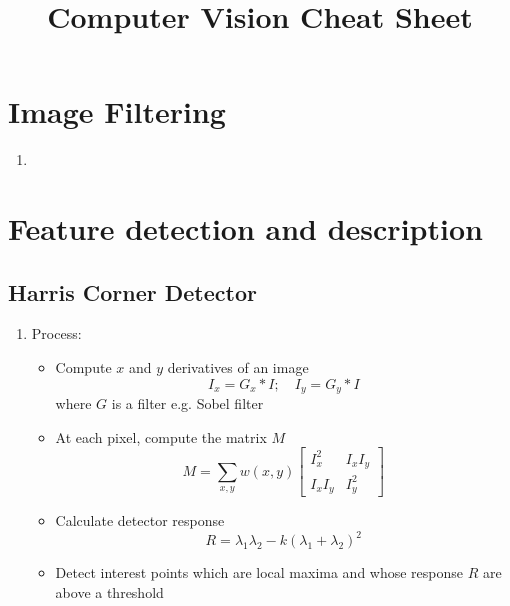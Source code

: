 \documentclass[9pt]{article}
\title{Computer Vision Cheat Sheet}
\begin{document}
\maketitle

\begin{multicols}{2}
    \section{Image Filtering}
        \begin{enumerate}
        \item  
        \end{enumerate}

    \columnbreak 

    \section{Feature detection and description}
        \subsection{Harris Corner Detector}
        \begin{enumerate}
            \item Process: 
            \begin{itemize}
                \item Compute $x$ and $y$ derivatives of an image
                $$
                    I_x = G_x \ast I; \quad I_y = G_y \ast I
                $$
                where $G$ is a filter e.g. Sobel filter 

                \item At each pixel, compute the matrix $M$
                $$
                    M = \sum_{x,y} w(x,y) \begin{bmatrix}
                        I_x^2 & I_x I_y \\ 
                        I_x I_y & I_y^2
                    \end{bmatrix}
                $$

                \item Calculate detector response
                $$
                    R = \lambda_1 \lambda_2 - k(\lambda_1 + \lambda_2)^2
                $$

                \item Detect interest points which are local maxima and whose response $R$ are
                above a threshold
            \end{itemize}
        \end{enumerate}


\end{multicols}
\end{document}
